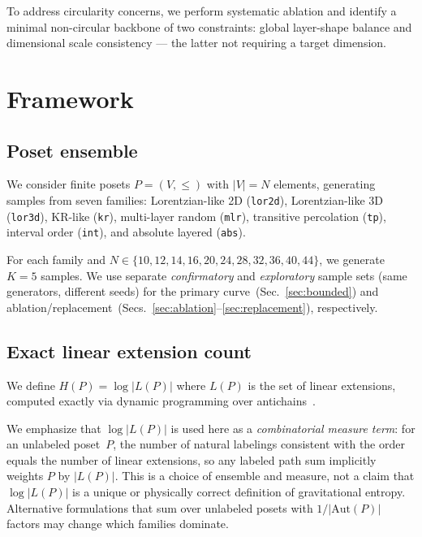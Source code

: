\documentclass[11pt,a4paper]{article}
\begin{document}
To address circularity concerns, we perform systematic ablation and identify a minimal non-circular backbone of two constraints: global layer-shape balance and dimensional scale consistency --- the latter not requiring a target dimension.

\section{Framework}
\label{sec:framework}

\subsection{Poset ensemble}

We consider finite posets $P = (V, \leq)$ with $|V| = N$ elements, generating samples from seven families: Lorentzian-like 2D (\texttt{lor2d}), Lorentzian-like 3D (\texttt{lor3d}), KR-like (\texttt{kr}), multi-layer random (\texttt{mlr}), transitive percolation (\texttt{tp}), interval order (\texttt{int}), and absolute layered (\texttt{abs}).

For each family and $N \in \{10, 12, 14, 16, 20, 24, 28, 32, 36, 40, 44\}$, we generate $K = 5$ samples. We use separate \emph{confirmatory} and \emph{exploratory} sample sets (same generators, different seeds) for the primary curve~(Sec.~\ref{sec:bounded}) and ablation/replacement~(Secs.~\ref{sec:ablation}--\ref{sec:replacement}), respectively.

\subsection{Exact linear extension count}

We define $H(P) = \log |L(P)|$ where $L(P)$ is the set of linear extensions, computed exactly via dynamic programming over antichains~\cite{brightwell1991}.

We emphasize that $\log|L(P)|$ is used here as a \emph{combinatorial measure term}: for an unlabeled poset~$P$, the number of natural labelings consistent with the order equals the number of linear extensions, so any labeled path sum implicitly weights $P$ by $|L(P)|$. This is a choice of ensemble and measure, not a claim that $\log|L(P)|$ is a unique or physically correct definition of gravitational entropy. Alternative formulations that sum over unlabeled posets with $1/|\mathrm{Aut}(P)|$ factors may change which families dominate.
\end{document}
